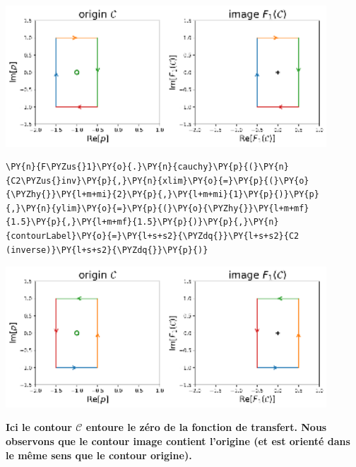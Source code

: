 \begin{center}
    \includegraphics[width=0.9\textwidth]{notebook/fig/output_20_1.eps}
\end{center}
\begin{tcolorbox}[breakable, size=fbox, boxrule=1pt, pad at break*=1mm,colback=cellbackground, colframe=cellborder]
\begin{Verbatim}[commandchars=\\\{\}]
\PY{n}{F\PYZus{}1}\PY{o}{.}\PY{n}{cauchy}\PY{p}{(}\PY{n}{C2\PYZus{}inv}\PY{p}{,}\PY{n}{xlim}\PY{o}{=}\PY{p}{(}\PY{o}{\PYZhy{}}\PY{l+m+mi}{2}\PY{p}{,}\PY{l+m+mi}{1}\PY{p}{)}\PY{p}{,}\PY{n}{ylim}\PY{o}{=}\PY{p}{(}\PY{o}{\PYZhy{}}\PY{l+m+mf}{1.5}\PY{p}{,}\PY{l+m+mf}{1.5}\PY{p}{)}\PY{p}{,}\PY{n}{contourLabel}\PY{o}{=}\PY{l+s+s2}{\PYZdq{}}\PY{l+s+s2}{C2 (inverse)}\PY{l+s+s2}{\PYZdq{}}\PY{p}{)}
\end{Verbatim}
\end{tcolorbox}
\begin{center}
    \includegraphics[width=0.9\textwidth]{notebook/fig/output_21_1.eps}
\end{center}
\textbf{Ici le contour \(\mathcal{C}\) entoure le zéro de la fonction de
transfert. Nous observons que le contour image contient l'origine (et
est orienté dans le même sens que le contour origine).} 
